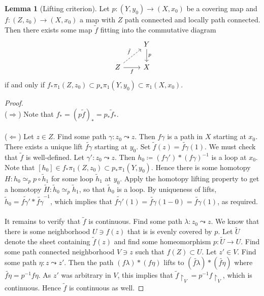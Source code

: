 \documentclass[10pt,letterpaper,cm]{nupset}
\theoremstyle{definition}
\theoremstyle{theorem}
\newtheorem{lemma}[definition]{Lemma}
\theoremstyle{remark}
\newcommand{\1}{\mathbb{1}}
\newcommand{\0}{\vec 0}
\begin{document}
\begin{lemma}[Lifting criterion]
Let $p: (Y, y_0) \to (X, x_0)$ be a covering map and $f: (Z, z_0) \to (X, x_0)$ a map with $Z$ path connected and locally path connected.  Then there exists some map $\tilde{f}$ fitting into the commutative diagram \[
\begin{tikzcd}
 & Y \arrow[d, "p"] \\
Z \arrow[r, "f"'] \arrow[ru, "\tilde{f}", dashed] & X
\end{tikzcd}
\] if and only if  $f_{\ast}\pi_1(Z, z_0) \subset p_{\ast} \pi_1(Y, y_0) \subset \pi_1(X, x_0)$. 
\end{lemma}
\begin{proof} $ $ \\
($\Longrightarrow$) Note that $f_{\ast} = (p\tilde{f})_{\ast}= p_{\ast}\tilde{f}_{\ast}$.
\\ \\ 
($\Longleftarrow$) Let $z\in Z$. Find some path $\gamma : z_0 \leadsto z$.  Then $f \gamma$ is a path in $X$ starting at $x_0$. There exists a unique lift $\widetilde{f \gamma}$ starting at $y_0$. Set $\tilde{f}(z) = \widetilde{f \gamma}(1)$. We must check that $\tilde{f}$ is well-defined. Let $\gamma' : z_0 \leadsto z$. Then $h_0\coloneqq (f \gamma ')\ast (f\gamma)^{-1}$ is a loop at $x_0$. Note that $[h_0] \in f_{\ast}\pi_1(Z, z_0) \subset p_{\ast} \pi_1(Y, y_0)$. Hence there is some homotopy $H: h_0 \simeq_p p \circ \tilde{h}_1$ for some loop $\tilde{h}_1$ at $y_0$. Apply the homotopy lifting property to get a homotopy $\widetilde{H} : \tilde{h}_0 \simeq_p \tilde{h}_1$, so that $\tilde{h}_0$ is a loop. By uniqueness of lifts, $\tilde{h}_0 =\widetilde{f \gamma '}\ast \widetilde{f\gamma}^{-1}$, which implies that $\widetilde{f \gamma '}(1) = \widetilde{f\gamma}(1-0) = \widetilde{f\gamma}(1)$, as required.
\\ \\ It remains to verify that $\tilde{f}$ is continuous. Find some path $\lambda : z_0 \leadsto z$. We know that there is some neighborhood $U \ni f(z)$ that is is evenly covered by $p$. Let $\widetilde{U}$ denote the sheet containing $\tilde{f}(z)$ and find some homeomorphism $p : \widetilde{U} \to U $. Find some path connected neighborhood $V\ni z$ such that $f(Z) \subset U$. Let $z' \in V$. Find some path $\eta : z \leadsto z'$. Then the path $(f \lambda )\ast (f \eta)$ lifts to $(\widetilde{f \lambda}) \ast (\widetilde{f \eta})$ where $\widetilde{f\eta} = p^{-1}f\eta$. As $z'$ was arbitrary in $V$, this implies that $\tilde{f}\restriction_V =p^{-1}f\restriction_V$, which is continuous. Hence $\tilde{f}$ is continuous as well. 
\end{proof}
\end{document}
